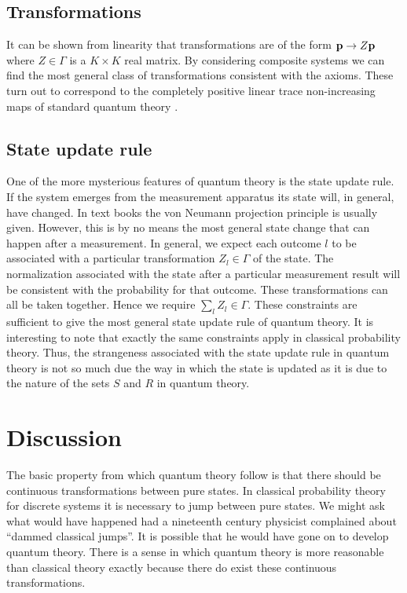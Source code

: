\documentclass[12pt]{article}
\begin{document}
\subsection{Transformations}

It can be shown from linearity that transformations are of the form
${\bf p}\rightarrow Z{\bf p}$ where $Z\in\Gamma$ is a $K\times K$ real
matrix.
By considering composite systems we can find the most general class of
transformations consistent with the axioms.  These turn out to
correspond to the completely positive linear trace non-increasing maps
of standard quantum theory \cite{krauss,nielsenchuang}.

\subsection{State update rule}

One of the more mysterious features of quantum theory is the state update
rule. If the system emerges from the measurement apparatus its state
will, in general, have changed.  In text books the von Neumann
projection principle is usually given. However, this is by no means the
most general state change that can happen after a measurement.  In
general, we expect each outcome $l$ to be associated with a particular
transformation $Z_l\in\Gamma$ of the state. The normalization associated
with the state after a particular measurement result will be consistent
with the probability for that outcome. These transformations can all be
taken together. Hence we require $\sum_l Z_l \in \Gamma$.  These
constraints are sufficient to give the most general state update rule of
quantum theory.  It is  interesting to note that exactly the same
constraints apply in
classical probability theory.  Thus, the strangeness associated with the
state update rule in quantum theory is not so much due the way in which
the state is updated as it is due to the nature of the sets $S$ and $R$
in quantum theory.

\section{Discussion}

The basic property from which quantum theory follow is that there should
be continuous transformations between pure states.  In classical
probability theory for discrete systems it is necessary to
jump between pure states.  We
might ask what would have happened had a nineteenth century physicist
complained about ``dammed classical jumps''.  It is possible that he
would have gone on to develop quantum theory.  There is a sense in
which quantum theory is more reasonable than classical theory exactly
because there do exist these continuous transformations.
\end{document}
